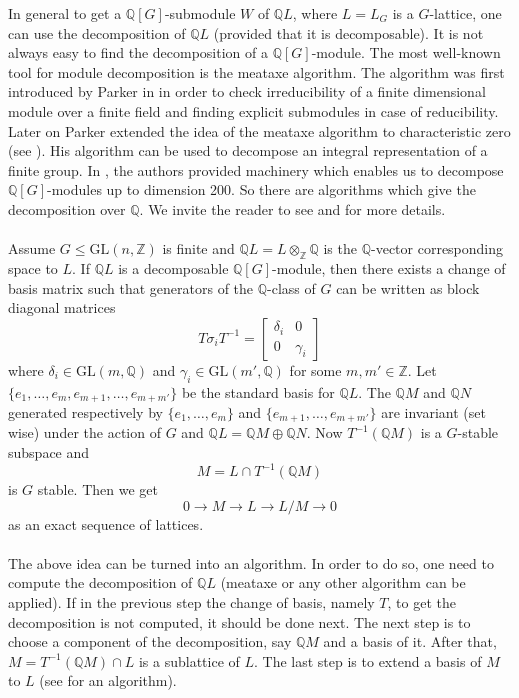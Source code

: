 \documentclass{article}
\theoremstyle{plain}
\theoremstyle{definition}
\newcommand{\Z}{\ensuremath{\mathbb{Z}}}
\newcommand{\Q}{\ensuremath{\mathbb{Q}}}
\begin{document}
\noindent
In general to get a $\Q[G]$-submodule $W$ of $\Q L$, where $L = L_G$ is a $G$-lattice, one can use the decomposition of $\Q L$ (provided that it is decomposable). It is not always easy to find the decomposition of a $\Q[G]$-module. The most well-known tool for module decomposition is the meataxe algorithm. The algorithm was first introduced by Parker in \cite{Parker} in order to check irreducibility of a finite dimensional module over a finite field and finding explicit submodules in case of reducibility. Later on Parker extended the idea of the meataxe algorithm to characteristic zero (see \cite{Parker2}). His algorithm can be used to decompose an integral representation of a finite group. In \cite{Plesken2}, the authors provided machinery which enables us to decompose $\Q[G]$-modules up to dimension 200. So there are algorithms which give the decomposition over $\Q$. We invite the reader to see \cite{Lux} and \cite{Holt} for more details. \\
\\
Assume $G \leq \mathrm{GL}(n,\Z)$ is finite and $\Q L = L \otimes_{\Z} \Q$ is the $\Q$-vector corresponding space to $L$. If $\Q L$ is a decomposable $\Q[G]$-module, then there exists a change of basis matrix such that generators of the $\Q$-class of $G$ can be written as block diagonal matrices
$$
T \sigma_i T^{-1} =  \left[ \begin{array}{c|c}
\delta_i & 0 \\
\hline
0 & \gamma_i
\end{array} \right]
$$
where $\delta_i	\in \mathrm{GL}(m,\Q)$ and $ \gamma_i \in \mathrm{GL}(m',\Q)$ for some $m, m' \in \Z$. Let $\lbrace e_1, \ldots, e_m, e_{m+1}, \ldots , e_{m+m'}\rbrace$ be the standard basis for $\Q L$. The $\Q M$ and $\Q N$ generated respectively by $\lbrace e_1, \ldots, e_m \rbrace$ and 
$\lbrace e_{m+1}, \ldots , e_{m+m'} \rbrace$ are invariant (set wise) under the action of $G$ and $\Q L = \Q M \oplus \Q N$. Now $T^{-1}(\Q M)$ is a $G$-stable subspace and $$M = L \cap T^{-1}(\Q M) $$ is $G$ stable. Then we get 
$$0 \longrightarrow M \longrightarrow L \longrightarrow L/M \longrightarrow 0$$
as an exact sequence of lattices.\\
\\
The above idea can be turned into an algorithm. In order to do so, one need to compute the decomposition of $\Q L$ (meataxe or any other algorithm can be applied). If in the previous step the change of basis, namely $T$, to get the decomposition is not computed, it should be done next. The next step is to choose a component of the decomposition, say $\Q M$ and a basis of it. After that, $M = T^{-1}(\Q M) \cap L$ is a sublattice of $L$. The last step is to extend a basis of $M$ to $L$ (see \cite{LatticeBase} for an algorithm). \\
\\
\end{document}
